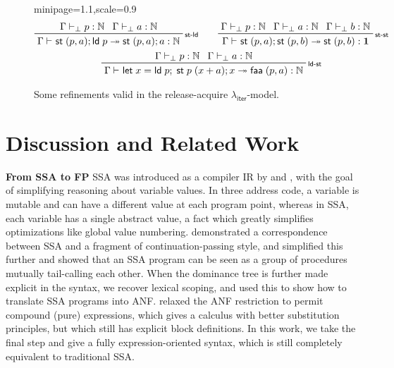 \documentclass[acmsmall,screen,anonymous,review]{acmart}
\newcommand{\mb}[1]{\ensuremath{\mathbf{#1}}}
\newcommand{\ms}[1]{\ensuremath{\mathsf{#1}}}
\newcommand{\nats}{\mathbb{N}}
\newcommand{\letexpr}[3]{\ensuremath{\ms{let}\;#1 = #2;\;#3}}
\newcommand{\rle}[1]{{\scriptsize\textsf{#1}}}
\newcommand{\hasty}[4]{#1 \vdash_{#2} #3: {#4}}
\newcommand{\tref}{\twoheadrightarrow}
\newcommand{\tmle}[5]{#1 \vdash_{#2} #3 \tref #4 : {#5}}
\newcommand{\subiterexp}{\texorpdfstring{\(\lambda_{\ms{iter}}\)}{lambda-iter}}
\begin{document}
\begin{figure}
  \begin{adjustbox}{minipage=1.1\textwidth,scale=0.9}
  \begin{gather*}
    \prftree[r]{\rle{st-ld}}
      {\hasty{\Gamma}{\bot}{p}{\nats}}
      {\hasty{\Gamma}{\bot}{a}{\nats}}
      {\tmle{\Gamma}{}{\ms{st}\;(p, a) ; \ms{ld}\;p}{\ms{st}\;(p, a) ; a}{\nats}}
      \qquad
    \prftree[r]{\rle{st-st}}
      {\hasty{\Gamma}{\bot}{p}{\nats}}
      {\hasty{\Gamma}{\bot}{a}{\nats}}
      {\hasty{\Gamma}{\bot}{b}{\nats}}
      {\tmle{\Gamma}{}{\ms{st}\;(p, a) ; \ms{st}\;(p, b)}{\ms{st}\;(p, b)}{\mb{1}}}
    \\
    \prftree[r]{\rle{ld-st}}
      {\hasty{\Gamma}{\bot}{p}{\nats}}
      {\hasty{\Gamma}{\bot}{a}{\nats}}
      {\tmle{\Gamma}{}{\letexpr{x}{\ms{ld}\;p}{\ms{st}\;p\;(x + a) ; x}}{\ms{faa}\;(p, a)}{\nats}}
  \end{gather*}
  \end{adjustbox}
  \caption{Some refinements valid in the release-acquire \subiterexp{}-model.}
  \label{fig:weak-refinements}
  \Description{}
\end{figure}

\section{Discussion and Related Work}

\textbf{From SSA to FP} SSA was introduced as a compiler IR by
\citet{alpern-ssa-original-88} and \citet{rosen-gvn-1988}, with the
goal of simplifying reasoning about variable values. In three address
code, a variable is mutable and can have a different value at each
program point, whereas in SSA, each variable has a single abstract
value, a fact which greatly simplifies optimizations like global value
numbering. \citet{kelsey-95-cps} demonstrated a correspondence between
SSA and a fragment of continuation-passing style, and
\citet{appel-ssa} simplified this further and showed that an SSA
program can be seen as a group of procedures mutually tail-calling
each other. When the dominance tree is further made explicit in the
syntax, we recover lexical scoping, and
\citet{chakravarty-functional-ssa-2003} used this to show how to
translate SSA programs into ANF. \citet{ghalayini-24-ssa-densem-arxiv}
relaxed the ANF restriction to permit compound (pure)
expressions, which gives a calculus with better substitution
principles, but which still has explicit block definitions. In this
work, we take the final step and give a fully expression-oriented
syntax, which is still completely equivalent to traditional SSA.
\end{document}
